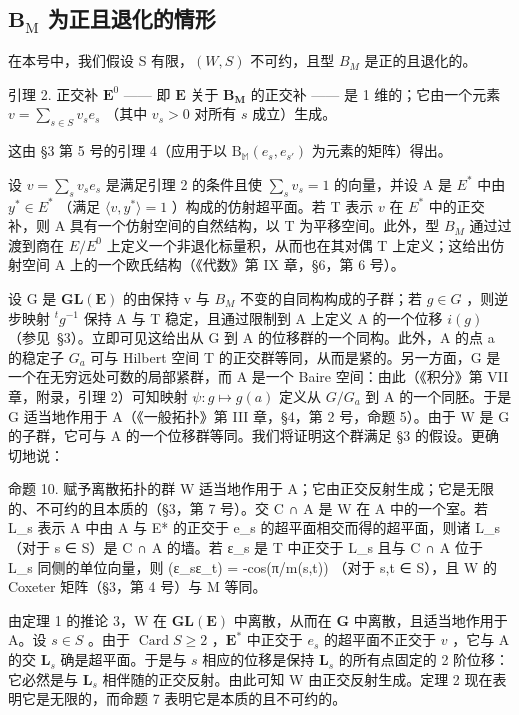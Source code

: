 \subsection{\texorpdfstring{\(\mathbf{B}_{\mathrm{M}}\) 为正且退化的情形}{B\_M 为正且退化的情形}}

在本号中，我们假设 S 有限，\((W, S)\) 不可约，且型 \(B_{M}\) 是正的且退化的。

引理 2. 正交补 \(\mathbf{E}^0\) —— 即 \(\mathbf{E}\) 关于 \(\mathbf{B}_{\mathbf{M}}\) 的正交补 —— 是 1 维的；它由一个元素 \(v = \sum_{s\in S}v_s e_s\) （其中 \(v_{s} > 0\) 对所有 \(s\) 成立）生成。

这由 §3 第 5 号的引理 4（应用于以 \(\mathrm{B}_{\mathbb{M}}(e_s, e_{s'})\) 为元素的矩阵）得出。

设 \(v = \sum_{s} v_s e_s\) 是满足引理 2 的条件且使 \(\sum_{s} v_s = 1\) 的向量，并设 A 是 \(E^*\) 中由 \(y^* \in E^*\) （满足 \(\langle v, y^* \rangle = 1\) ）构成的仿射超平面。若 T 表示 \(v\) 在 \(E^*\) 中的正交补，则 A 具有一个仿射空间的自然结构，以 T 为平移空间。此外，型 \(B_M\) 通过过渡到商在 \(E/E^0\) 上定义一个非退化标量积，从而也在其对偶 T 上定义；这给出仿射空间 A 上的一个欧氏结构（《代数》第 IX 章，§6，第 6 号）。

设 G 是 \(\mathbf{GL}(\mathbf{E})\) 的由保持 v 与 \(B_{M}\) 不变的自同构构成的子群；若 \(g \in G\) ，则逆步映射 \({}^{t}g^{-1}\) 保持 A 与 T 稳定，且通过限制到 A 上定义 A 的一个位移 \(i(g)\) （参见~§3）。立即可见这给出从 G 到 A 的位移群的一个同构。此外，A 的点 a 的稳定子 \(G_{a}\) 可与 Hilbert 空间 T 的正交群等同，从而是紧的。另一方面，G 是一个在无穷远处可数的局部紧群，而 A 是一个 Baire 空间：由此（《积分》第 VII 章，附录，引理 2）可知映射 \(\psi : g \mapsto g(a)\) 定义从 \(G/G_a\) 到 A 的一个同胚。于是 G 适当地作用于 A（《一般拓扑》第 III 章，§4，第 2 号，命题 5）。由于 W 是 G 的子群，它可与 A 的一个位移群等同。我们将证明这个群满足 §3 的假设。更确切地说：

命题 10. 赋予离散拓扑的群 W 适当地作用于 A；它由正交反射生成；它是无限的、不可约的且本质的（§3，第 7 号）。交 C ∩ A 是 W 在 A 中的一个室。若 L\_s 表示 A 中由 A 与 E* 的正交于 e\_s 的超平面相交而得的超平面，则诸 L\_s （对于 s ∈ S）是 C ∩ A 的墙。若 ε\_s 是 T 中正交于 L\_s 且与 C ∩ A 位于 L\_s 同侧的单位向量，则 (ε\_s\textbar ε\_t) = -cos(π/m(s,t)) （对于 s,t ∈ S），且 W 的 Coxeter 矩阵（§3，第 4 号）与 M 等同。

由定理 1 的推论 3，W 在 \(\mathbf{GL}(\mathbf{E})\) 中离散，从而在 \(\mathbf{G}\) 中离散，且适当地作用于 A。设 \(s \in S\) 。由于 \(\operatorname{Card} S \geqslant 2\) ，\(\mathbf{E}^*\) 中正交于 \(e_s\) 的超平面不正交于 \(v\) ，它与 A 的交 \(\mathbf{L}_s\) 确是超平面。于是与 \(s\) 相应的位移是保持 \(\mathbf{L}_s\) 的所有点固定的 2 阶位移：它必然是与 \(\mathbf{L}_s\) 相伴随的正交反射。由此可知 W 由正交反射生成。定理 2 现在表明它是无限的，而命题 7 表明它是本质的且不可约的。

